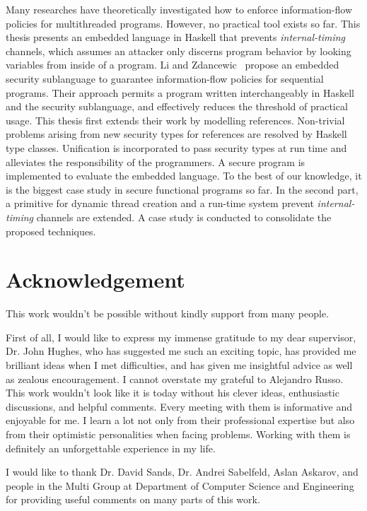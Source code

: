 \documentclass{report}
\begin{document}
Many researches have theoretically investigated how to enforce information-flow
policies for multithreaded programs. However, no practical tool exists so far.
This thesis presents an embedded language in Haskell that prevents
{\em internal-timing} channels, which assumes an attacker only discerns program
behavior by looking variables from inside of a program.
Li and Zdancewic~\cite{Li:Zdancewic:CSFW} propose
an embedded security sublanguage to guarantee information-flow policies for
sequential programs. Their approach permits a program written interchangeably
in Haskell and the security sublanguage, and effectively reduces the threshold
of practical usage.
This thesis first extends their work by modelling references. Non-trivial
problems arising from new security types for references are resolved by
Haskell type classes. Unification is incorporated to pass security types
at run time and alleviates the responsibility of the programmers.
A secure program is implemented to evaluate the embedded language.
To the best of our knowledge, it is the biggest case study in secure
functional programs so far.
In the second part, a primitive for dynamic thread creation and a run-time
system prevent {\em internal-timing} channels are extended.
A case study is conducted to consolidate the proposed techniques.


\chapter*{Acknowledgement}

This work wouldn't be possible without kindly support from many people.

First of all, I would like to express my immense gratitude to my dear supervisor, 
Dr. John Hughes, who has suggested me such an exciting topic, has provided me brilliant ideas
when I met difficulties, and has given me insightful advice as well as zealous encouragement.
I cannot overstate my grateful to Alejandro Russo. This work wouldn't look like it is today
without his clever ideas, enthusiastic discussions, and helpful comments.
Every meeting with them is informative and enjoyable for me.  
I learn a lot not only from their professional expertise but also from their optimistic personalities
when facing problems.
Working with them is definitely an unforgettable experience in my life.

I would like to thank Dr. David Sands, Dr. Andrei Sabelfeld, Aslan Askarov, and people in the Multi
Group at Department of Computer Science and Engineering for providing useful comments on many 
parts of this work.
\end{document}
